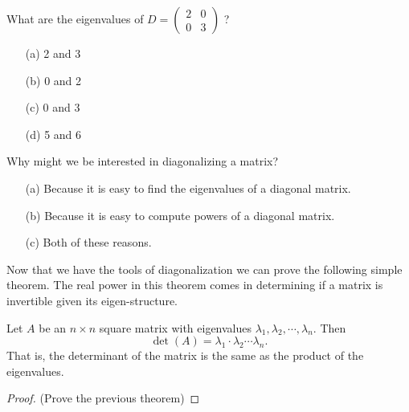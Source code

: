 \begin{problem}
    What are the eigenvalues of $D = 
\left( \begin{array}{cc}
2 & 0 \\
0 & 3 \end{array} \right)$ ?

\begin{enumerate}
    \item[(a)] 2 and 3
\item[(b)] 0 and 2
\item[(c)] 0 and 3
\item[(d)] 5 and 6
\end{enumerate}
\end{problem}
%             



\begin{problem}
    Why might we be interested in diagonalizing a matrix?
\begin{enumerate}
    \item[(a)] Because it is easy to find the eigenvalues of a diagonal matrix.
    \item[(b)] Because it is easy to compute powers of a diagonal matrix.
    \item[(c)] Both of these reasons.
\end{enumerate}
\end{problem}
%             

Now that we have the tools of diagonalization we can prove the following simple theorem.
The real power in this theorem comes in determining if a matrix is invertible given its
eigen-structure.
\begin{thm}
    Let $A$ be an $n \times n$ square matrix with eigenvalues $\lambda_1, \lambda_2,
    \cdots, \lambda_n$.  Then
    \[ \det(A) = \lambda_1 \cdot \lambda_2 \cdots \lambda_n. \]
    That is, the determinant of the matrix is the same as the product of the eigenvalues.
\end{thm}
\begin{proof}
    (Prove the previous theorem)
\end{proof}

